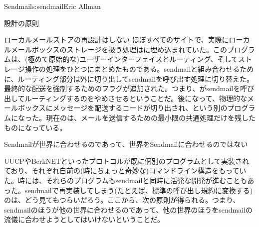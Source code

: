 \begin{aosachapter}{Sendmail}{s:sendmail}{Eric Allman}
\begin{aosasect1}{設計の原則}
\begin{aosasect2}{ローカルメールストアの再設計はしない}
ほぼすべてのサイトで、実際にローカルメールボックスのストレージを扱う処理はに埋め込まれていた。このプログラムは、(極めて原始的な)ユーザーインターフェイスとルーティング、そしてストレージ操作の処理をひとつにまとめたものである。sendmailと組み合わせるために、ルーティング部分は外に切り出してsendmailを呼び出す処理に切り替えた。最終的な配送を強制するためのフラグが追加された。つまり、がsendmailを呼び出してルーティングするのをやめさせるということだ。後になって、物理的なメールボックスにメッセージを配送するコードが切り出され、という別のプログラムになった。現在のは、メールを送信するための最小限の共通処理だけを残したものになっている。

\end{aosasect2}

\begin{aosasect2}{Sendmailが世界に合わせるのであって、世界をSendmailに合わせるのではない}

UUCPやBerkNETといったプロトコルが既に個別のプログラムとして実装されており、それぞれ自前の(時にちょっと奇妙な)コマンドライン構造をもっていた。時には、それらのプログラムもsendmailと同時に活発な開発が進むこともあった。sendmailで再実装してしまう(たとえば、標準の呼び出し規約に変換する)のは、どう見てもつらいだろう。ここから、次の原則が得られる。つまり、sendmailのほうが他の世界に合わせるのであって、他の世界のほうをsendmailの流儀に合わせようとしてはいけないということだ。


\end{aosasect2}
\end{aosasect1}
\end{aosachapter}
